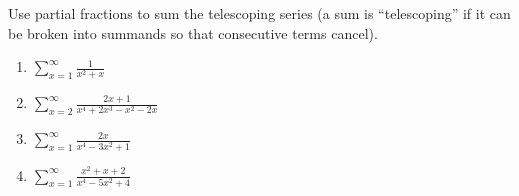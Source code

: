 Use partial fractions to sum the telescoping series (a sum is ``telescoping'' if it can be broken into summands so that consecutive terms cancel).
\begin{multicols}{2}
\begin{enumerate}
\item $\displaystyle \sum\limits_{x=1}^\infty \frac{1}{x^{2}+x}$

\item $\displaystyle \sum\limits_{x=2}^\infty\frac{2 x+1}{x^{4}+2 x^{3}- x^{2}-2 x}$


\item $\displaystyle \sum\limits_{x=1}^\infty \frac{2 x}{x^{4}-3 x^{2}+1}$


\item $\displaystyle \sum\limits_{x=1}^\infty \frac{x^{2}+x+2}{ x^{4}- 5  x^{2}+4}$

\end{enumerate}
\end{multicols}